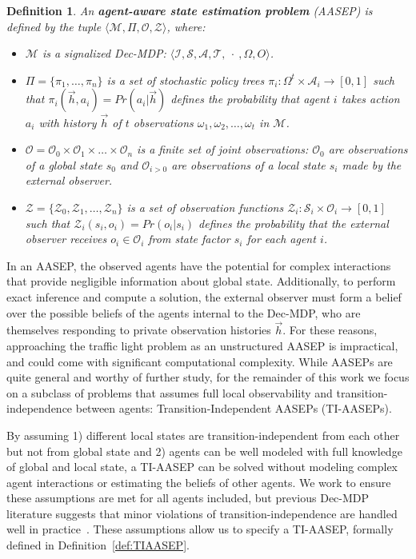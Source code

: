 \documentclass[letterpaper,10pt,conference]{ieeeconf}
\newtheorem{definition}{Definition}
\begin{document}
\begin{definition}
    An \textbf{agent-aware state estimation problem} (AASEP) is defined by the tuple $\langle \mathcal{M}, \Pi, \mathcal{O}, \mathcal{Z} \rangle$, where:
    \begin{itemize}
        \item $\mathcal{M}$ is a signalized Dec-MDP: $\langle \mathcal{I, S, A, T, \ \cdot \ }, \Omega, O \rangle$.
        \item $\Pi = \{ \pi_1, \dots, \pi_n \}$ is a set of stochastic policy trees $\pi_i : \Omega^t \times \mathcal{A}_i \rightarrow [0, 1]$ such that $\pi_i(\vec{h}, a_i) = Pr(a_i|\vec{h})$ defines the probability that agent $i$ takes action $a_i$ with history $\vec{h}$ of $t$ observations $\omega_1, \omega_2, \dots, \omega_t$ in $\mathcal{M}$.
        \item $\mathcal{O} = \mathcal{O}_0 \times \mathcal{O}_1 \times \dots \times \mathcal{O}_n$ is a finite set of joint observations: $\mathcal{O}_0$ are observations of a global state $s_0$ and $\mathcal{O}_{i > 0}$ are observations of a local state $s_i$ made by the external observer.
        \item $\mathcal{Z} = \{ \mathcal{Z}_0, \mathcal{Z}_1, \dots, \mathcal{Z}_n \}$ is a set of observation functions $\mathcal{Z}_i: \mathcal{S}_i \times \mathcal{O}_i \rightarrow [0, 1]$ such that $\mathcal{Z}_i(s_i, o_i) = Pr(o_i|s_i)$ defines the probability that the external observer receives $o_i \in \mathcal{O}_{i}$ from state factor $s_i$ for each agent $i$.
    \end{itemize}
    \label{def:AASEP}
\end{definition}

In an AASEP, the observed agents have the potential for complex interactions that provide negligible information about global state. Additionally, to perform exact inference and compute a solution, the external observer must form a belief over the possible beliefs of the agents internal to the Dec-MDP, who are themselves responding to private observation histories $\vec{h}$. For these reasons, approaching the traffic light problem as an unstructured AASEP is impractical, and could come with significant computational complexity. While AASEPs are quite general and worthy of further study, for the remainder of this work we focus on a subclass of problems that assumes full local observability and transition-independence between agents: Transition-Independent AASEPs (TI-AASEPs).

By assuming 1) different local states are transition-independent from each other but not from global state and 2) agents can be well modeled with full knowledge of global and local state, a TI-AASEP can be solved without modeling complex agent interactions or estimating the beliefs of other agents. We work to ensure these assumptions are met for all agents included, but previous Dec-MDP literature suggests that minor violations of transition-independence are handled well in practice~\cite{SZ:BZLGjair04}. These assumptions allow us to specify a TI-AASEP, formally defined in Definition~\ref{def:TIAASEP}.
\end{document}
